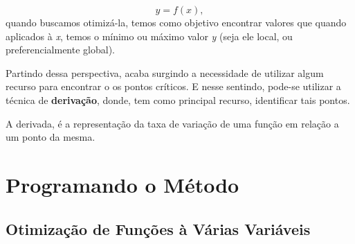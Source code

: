 \begin{equation}
	y = f(x),
\end{equation}
quando buscamos otimizá-la, temos como objetivo encontrar valores que quando
aplicados à \textit{x}, temos o mínimo ou máximo valor \textit{y} (seja ele
local, ou preferencialmente global).

Partindo dessa perspectiva, acaba surgindo a necessidade de utilizar algum
recurso para encontrar o os pontos críticos. E nesse sentindo, pode-se utilizar
a técnica de \textbf{derivação}, donde, tem como principal recurso, identificar
tais pontos.

A derivada, é a representação da taxa de variação de uma função em relação a
um ponto da mesma.



\section{{Programando o Método}}

\hspace{0.8cm}





\textcolor[rgb]{1,0,0}{\section{{Otimização de Funções à Várias Variáveis}}}

\hspace{0.8cm}





%
